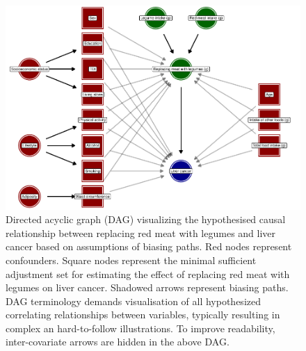 \documentclass[sn-basic,Numbered,iicol,pdflatex]{sn-jnl}
\begin{document}
\begin{appendices}
\begin{figure}[!b]
\includegraphics[width=1\linewidth,]{legliv_eur-j-nutr_files/figure-latex/fig2-1} \caption{Directed acyclic graph (DAG) visualizing the hypothesised causal relationship between replacing red meat with legumes and liver cancer based on assumptions of biasing paths. Red nodes represent confounders. Square nodes represent the minimal sufficient adjustment set for estimating the effect of replacing red meat with legumes on liver cancer. Shadowed arrows represent biasing paths. DAG terminology demands visualisation of all hypothesized correlating relationships between variables, typically resulting in complex an hard-to-follow illustrations. To improve readability, inter-covariate arrows are hidden in the above DAG.}\label{fig:fig2}
\end{figure}

\newpage


\end{appendices}
\end{document}

